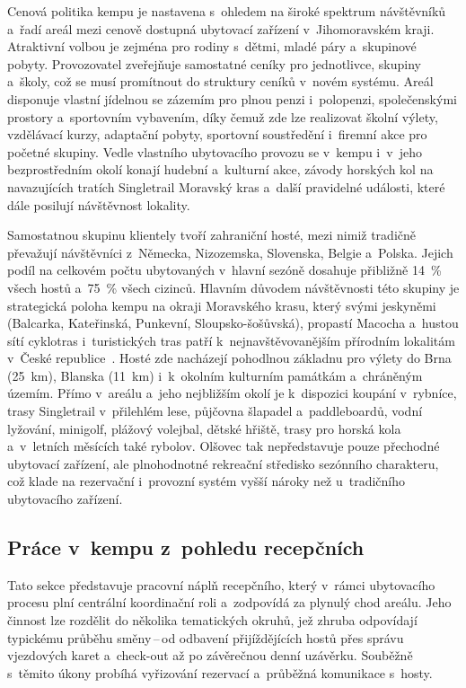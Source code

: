 Cenová politika kempu je nastavena s~ohledem na široké spektrum návštěvníků a~řadí areál mezi cenově dostupná ubytovací zařízení v~Jihomoravském kraji.
Atraktivní volbou je zejména pro rodiny s~dětmi, mladé páry a~skupinové pobyty.
Provozovatel zveřejňuje samostatné ceníky pro jednotlivce, skupiny a~školy, což se musí promítnout do struktury ceníků v~novém systému.
Areál disponuje vlastní jídelnou se zázemím pro plnou penzi i~polopenzi, společenskými prostory a~sportovním vybavením, díky čemuž zde lze realizovat školní výlety, vzdělávací kurzy, adaptační pobyty, sportovní soustředění i~firemní akce pro početné skupiny.
Vedle vlastního ubytovacího provozu se v~kempu i~v~jeho bezprostředním okolí konají hudební a~kulturní akce, závody horských kol na navazujících tratích Singletrail Moravský kras a~další pravidelné události, které dále posilují návštěvnost lokality.

Samostatnou skupinu klientely tvoří zahraniční hosté, mezi nimiž tradičně převažují návštěvníci z~Německa, Nizozemska, Slovenska, Belgie a~Polska.
Jejich podíl na celkovém počtu ubytovaných v~hlavní sezóně dosahuje přibližně 14~\% všech hostů a~75~\% všech cizinců.
Hlavním důvodem návštěvnosti této skupiny je strategická poloha kempu na okraji Moravského krasu, který svými jeskyněmi (Balcarka, Kateřinská, Punkevní, Sloupsko-šošůvská), propastí Macocha a~hustou sítí cyklotras i~turistických tras patří k~nejnavštěvovanějším přírodním lokalitám v~České republice~\cite{ochranaprirody-moravskykras}.
Hosté zde nacházejí pohodlnou základnu pro výlety do Brna (25~km), Blanska (11~km) i~k~okolním kulturním památkám a~chráněným územím.
Přímo v~areálu a~jeho nejbližším okolí je k~dispozici koupání v~rybníce, trasy Singletrail v~přilehlém lese, půjčovna šlapadel a~paddleboardů, vodní lyžování, minigolf, plážový volejbal, dětské hřiště, trasy pro horská kola a~v~letních měsících také rybolov.
Olšovec tak nepředstavuje pouze přechodné ubytovací zařízení, ale plnohodnotné rekreační středisko sezónního cha\-ra\-kte\-ru, což klade na rezervační i~provozní systém vyšší nároky než u~tradičního ubytovacího zařízení.

\subsection{Práce v~kempu z~pohledu recepčních}

Tato sekce představuje pracovní náplň recepčního, který v~rámci ubytovacího procesu plní centrální koordinační roli a~zodpovídá za plynulý chod areálu.
Jeho činnost lze rozdělit do několika tematických okruhů, jež zhruba odpovídají typickému průběhu směny\,--\,od odbavení přijíždějících hostů přes správu vjezdových karet a~check-out až po závěrečnou denní uzávěrku.
Souběžně s~těmito úkony probíhá vyřizování rezervací a~průběžná komunikace s~hosty.

